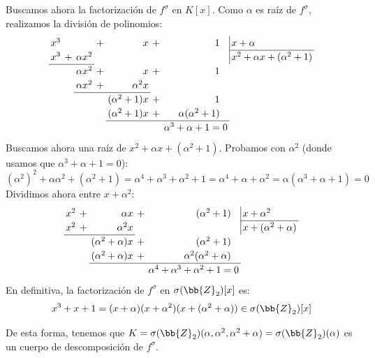 \begin{ejemplo}
    Buscamos ahora la factorización de $f^\sigma$ en $K[x]$. Como $\alpha$ es raíz de $f^\sigma$, realizamos la división de polinomios:
    \[
    \renewcommand{\arraystretch}{1.2}
    \setlength{\arraycolsep}{2pt}
    \begin{array}{rrrrrrr@{\quad}l}
    x^3 &   &      & + & x          & + & 1                  & \multicolumn{1}{|l}{x + \alpha } \\ \cline{8-8}
    x^3 & + & \alpha x^2 &   &            &   &                    & \multicolumn{1}{|l}{x^2 + \alpha x + (\alpha ^2 + 1)} \\ \cline{1-3}
        &   & \alpha x^2 & + & x          & + & 1                  & \\
        &   & \alpha x^2 & + & \alpha^2 x      &   &                    & \\ \cline{3-5}
        &   &      &   & (\alpha^2 + 1)x & + & 1                  & \\
        &   &      &   & (\alpha^2 + 1)x & + & \alpha(\alpha^2 + 1)         & \\ \cline{5-7}
        &   &      &   &            &   & \multicolumn{1}{c}{\alpha^3 + \alpha + 1 = 0} &
    \end{array}
    \]
    Buscamos ahora una raíz de $x^2+\alpha x+(\alpha ^2+1)$. Probamos con $\alpha ^2$ (donde usamos que $\alpha^3 + \alpha + 1 = 0$):
    \begin{equation*}
        {\left(\alpha^2\right)}^{2}+ \alpha \alpha^2 + (\alpha^2+1) = \alpha^4 + \alpha^3 + \alpha^2 + 1 = \alpha^4 + \alpha + \alpha^2 = \alpha(\alpha^3 + \alpha + 1) = 0
    \end{equation*}
    Dividimos ahora entre $x+\alpha^2$:
        \[
        \renewcommand{\arraystretch}{1.2}
        \setlength{\arraycolsep}{2pt}
        \begin{array}{rrrrr@{\quad}l}
        x^2 & + & \alpha x               & + & (\alpha^2 + 1)                      & \multicolumn{1}{|l}{x + \alpha^2} \\ \cline{6-6}
        x^2 & + & \alpha^2 x             &   &                                     & \multicolumn{1}{|l}{x + (\alpha^2 + \alpha)} \\ \cline{1-3}
            &   & (\alpha^2 + \alpha)x   & + & (\alpha^2 + 1)                      & \\
            &   & (\alpha^2 + \alpha)x   & + & \alpha^2(\alpha^2 + \alpha)         & \\ \cline{3-5}
            &   &                        &   & \multicolumn{1}{c}{\alpha^4 + \alpha^3 + \alpha^2 + 1 = 0} & 
        \end{array}
        \]
    En definitiva, la factorización de $f^\sigma$ en $\sigma(\bb{Z}_2)[x]$ es:
    \begin{equation*}
        x^3+x+1 = (x+\alpha)(x+\alpha^2)(x+(\alpha^2+\alpha)) \in \sigma(\bb{Z}_2)[x]
    \end{equation*}

    De esta forma, tenemos que $K = \sigma(\bb{Z}_2)(\alpha,\alpha^2,\alpha^2+\alpha)= \sigma(\bb{Z}_2)(\alpha)$ es un cuerpo de descomposición de $f^\sigma$.
\end{ejemplo}

